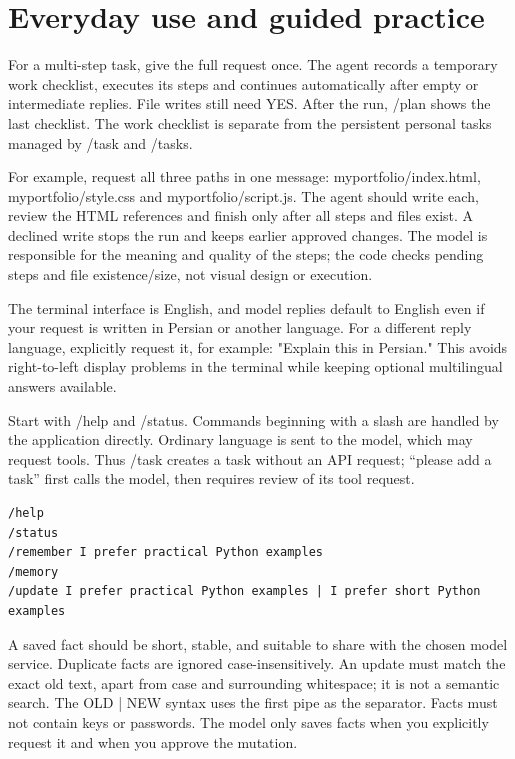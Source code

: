 \chapter{Everyday use and guided practice}

For a multi-step task, give the full request once. The agent records a temporary work checklist, executes its steps and continues automatically after empty or intermediate replies. File writes still need YES. After the run, /plan shows the last checklist. The work checklist is separate from the persistent personal tasks managed by /task and /tasks.

For example, request all three paths in one message: myportfolio/index.html, myportfolio/style.css and myportfolio/script.js. The agent should write each, review the HTML references and finish only after all steps and files exist. A declined write stops the run and keeps earlier approved changes. The model is responsible for the meaning and quality of the steps; the code checks pending steps and file existence/size, not visual design or execution.

The terminal interface is English, and model replies default to English even if your request is written in Persian or another language. For a different reply language, explicitly request it, for example: "Explain this in Persian." This avoids right-to-left display problems in the terminal while keeping optional multilingual answers available.

Start with /help and /status. Commands beginning with a slash are handled by the application directly. Ordinary language is sent to the model, which may request tools. Thus /task creates a task without an API request; “please add a task” first calls the model, then requires review of its tool request.

\begin{Verbatim}[breaklines,breakanywhere,fontsize=\small]
/help
/status
/remember I prefer practical Python examples
/memory
/update I prefer practical Python examples | I prefer short Python examples
\end{Verbatim}

A saved fact should be short, stable, and suitable to share with the chosen model service. Duplicate facts are ignored case-insensitively. An update must match the exact old text, apart from case and surrounding whitespace; it is not a semantic search. The OLD | NEW syntax uses the first pipe as the separator. Facts must not contain keys or passwords. The model only saves facts when you explicitly request it and when you approve the mutation.

